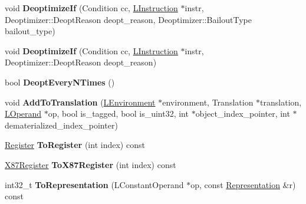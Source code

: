 \begin{DoxyCompactItemize}
\item 
void {\bfseries Deoptimize\+If} (Condition cc, \hyperlink{classv8_1_1internal_1_1_l_instruction}{L\+Instruction} $\ast$instr, Deoptimizer\+::\+Deopt\+Reason deopt\+\_\+reason, Deoptimizer\+::\+Bailout\+Type bailout\+\_\+type)\hypertarget{classv8_1_1internal_1_1_l_code_gen_a9d452933b6c4ab49e99819782c3d3bd2}{}\label{classv8_1_1internal_1_1_l_code_gen_a9d452933b6c4ab49e99819782c3d3bd2}

\item 
void {\bfseries Deoptimize\+If} (Condition cc, \hyperlink{classv8_1_1internal_1_1_l_instruction}{L\+Instruction} $\ast$instr, Deoptimizer\+::\+Deopt\+Reason deopt\+\_\+reason)\hypertarget{classv8_1_1internal_1_1_l_code_gen_ac1bc02d00cc21a8407b9d2832809938c}{}\label{classv8_1_1internal_1_1_l_code_gen_ac1bc02d00cc21a8407b9d2832809938c}

\item 
bool {\bfseries Deopt\+Every\+N\+Times} ()\hypertarget{classv8_1_1internal_1_1_l_code_gen_a2fde56b4e76b315c3b53cf919409d719}{}\label{classv8_1_1internal_1_1_l_code_gen_a2fde56b4e76b315c3b53cf919409d719}

\item 
void {\bfseries Add\+To\+Translation} (\hyperlink{classv8_1_1internal_1_1_l_environment}{L\+Environment} $\ast$environment, Translation $\ast$translation, \hyperlink{classv8_1_1internal_1_1_l_operand}{L\+Operand} $\ast$op, bool is\+\_\+tagged, bool is\+\_\+uint32, int $\ast$object\+\_\+index\+\_\+pointer, int $\ast$dematerialized\+\_\+index\+\_\+pointer)\hypertarget{classv8_1_1internal_1_1_l_code_gen_a418f466c19b6671a29663f4378a36d8c}{}\label{classv8_1_1internal_1_1_l_code_gen_a418f466c19b6671a29663f4378a36d8c}

\item 
\hyperlink{structv8_1_1internal_1_1_register}{Register} {\bfseries To\+Register} (int index) const \hypertarget{classv8_1_1internal_1_1_l_code_gen_ae4d98c4f4146a2d8ea844342a5bae0ea}{}\label{classv8_1_1internal_1_1_l_code_gen_ae4d98c4f4146a2d8ea844342a5bae0ea}

\item 
\hyperlink{structv8_1_1internal_1_1_double_register}{X87\+Register} {\bfseries To\+X87\+Register} (int index) const \hypertarget{classv8_1_1internal_1_1_l_code_gen_a6685fcddb4fa9fe6e3330f7cce4657c8}{}\label{classv8_1_1internal_1_1_l_code_gen_a6685fcddb4fa9fe6e3330f7cce4657c8}

\item 
int32\+\_\+t {\bfseries To\+Representation} (L\+Constant\+Operand $\ast$op, const \hyperlink{classv8_1_1internal_1_1_representation}{Representation} \&r) const \hypertarget{classv8_1_1internal_1_1_l_code_gen_a0e99f5084c7765aa53aa0537c112b4f1}{}\label{classv8_1_1internal_1_1_l_code_gen_a0e99f5084c7765aa53aa0537c112b4f1}


\end{DoxyCompactItemize}
